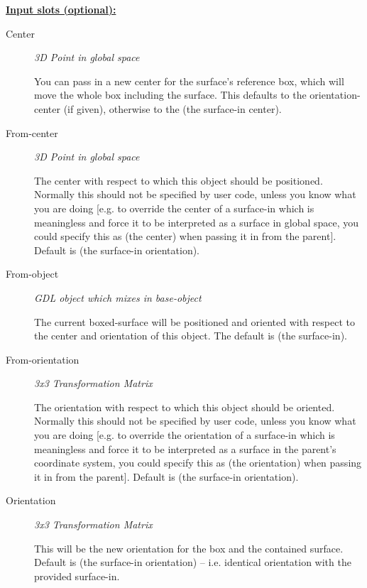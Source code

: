 \documentclass [11pt]{book}
\begin{document}
\begin{itemize}
\textbf{
\underline{Input slots (optional):}}

\begin{description}

\item [Center]
\emph{3D Point in global space}

 You can pass in a new center for the surface's reference box,
which will move the whole box including the surface. This defaults to the
orientation-center (if given), otherwise to the (the surface-in center).




\item [From-center]
\emph{3D Point in global space}

 The center with respect to which this object should be positioned. Normally
this should not be specified by user code, unless you know what you are doing [e.g. to override the center
of a surface-in which is meaningless and force it to be interpreted as a surface in global space, you could
specify this as (the center) when passing it in from the parent]. Default is (the surface-in orientation).




\item [From-object]
\emph{GDL object which mixes in base-object}

 The current boxed-surface will be positioned and oriented with respect
to the center and orientation of this object. The default is (the surface-in).




\item [From-orientation]
\emph{3x3 Transformation Matrix}

 The orientation with respect to which this object should be oriented. Normally
this should not be specified by user code, unless you know what you are doing [e.g. to override the orientation
of a surface-in which is meaningless and force it to be interpreted as a surface in the parent's coordinate system,
you could specify this as (the orientation) when passing it in from the parent]. Default is (the surface-in orientation).




\item [Orientation]
\emph{3x3 Transformation Matrix}

 This will be the new orientation for the box and the contained surface. Default is
(the surface-in orientation) -- i.e. identical orientation with the provided surface-in.





\end{description}
\end{itemize}
\end{document}
